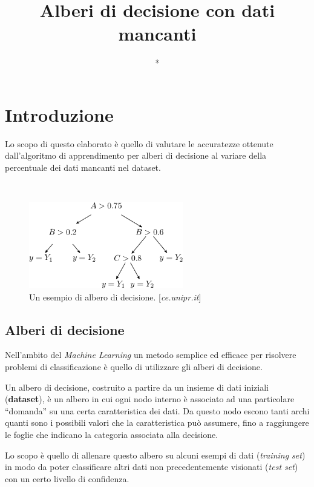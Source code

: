 \documentclass[a4paper,12pt]{article}
\title{Alberi di decisione con dati mancanti}
\author{*}
\begin{document}
\maketitle

\section{Introduzione}
Lo scopo di questo elaborato è quello di valutare le accuratezze ottenute dall'algoritmo di apprendimento per alberi di
decisione al variare della percentuale dei dati mancanti nel dataset.

\
\begin{figure}[h]
    \centering
    \captionsetup{justification=centering,margin=1cm}
    \includegraphics[width=0.6\textwidth]{./fig_decisiontree}
    \vspace*{5mm}
    \caption{Un esempio di albero di decisione. [\textit{ce.unipr.it}]}
    \label{fig:dec}
\end{figure}

\subsection{Alberi di decisione}

Nell’ambito del \textit{Machine Learning} un metodo semplice ed efficace per risolvere problemi di classificazione è quello di utilizzare gli alberi di decisione.
\newline

 Un albero di decisione, costruito a partire da un insieme di dati iniziali (\textbf{dataset}), è un albero in cui ogni nodo interno è associato ad una particolare “domanda” su una certa caratteristica dei dati. Da questo nodo escono tanti archi quanti sono i possibili valori che la caratteristica può assumere, fino a raggiungere le foglie che indicano la categoria associata alla decisione.
 \newline

 Lo scopo è quello di allenare questo albero su alcuni esempi di dati (\textit{training set}) in modo da poter classificare altri dati non precedentemente visionati (\textit{test set}) con un certo livello di confidenza.
\newline
\end{document}
